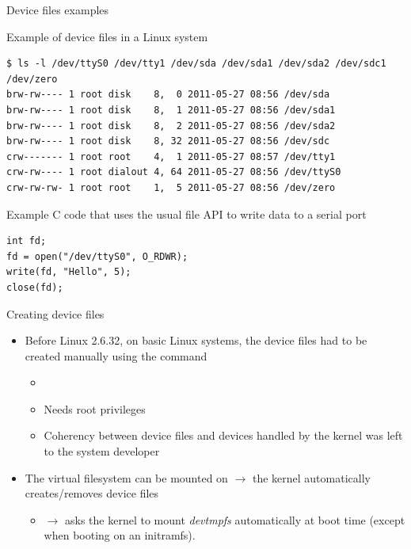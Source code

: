 \begin{frame}[fragile]{Device files examples}

Example of device files in a Linux system

\small
\begin{verbatim}
$ ls -l /dev/ttyS0 /dev/tty1 /dev/sda /dev/sda1 /dev/sda2 /dev/sdc1 /dev/zero
brw-rw---- 1 root disk    8,  0 2011-05-27 08:56 /dev/sda
brw-rw---- 1 root disk    8,  1 2011-05-27 08:56 /dev/sda1
brw-rw---- 1 root disk    8,  2 2011-05-27 08:56 /dev/sda2
brw-rw---- 1 root disk    8, 32 2011-05-27 08:56 /dev/sdc
crw------- 1 root root    4,  1 2011-05-27 08:57 /dev/tty1
crw-rw---- 1 root dialout 4, 64 2011-05-27 08:56 /dev/ttyS0
crw-rw-rw- 1 root root    1,  5 2011-05-27 08:56 /dev/zero
\end{verbatim}
\normalsize

Example C code that uses the usual file API to write data to a serial port

\small
\begin{verbatim}
int fd;
fd = open("/dev/ttyS0", O_RDWR);
write(fd, "Hello", 5);
close(fd);
\end{verbatim}
\end{frame}

\begin{frame}{Creating device files}
  \begin{itemize}
    \item Before Linux 2.6.32, on basic Linux systems,
    the device files had to be created manually using the
     command
    \begin{itemize}
    \item {}
    \item Needs root privileges
    \item Coherency between device files and devices handled by the
      kernel was left to the system developer
    \end{itemize}
  \item The  virtual filesystem can be mounted on
     $\rightarrow$ the kernel automatically creates/removes
    device files
    \begin{itemize}
    \item {} $\rightarrow$ asks the
      kernel to mount {\em devtmpfs} automatically at boot time
      (except when booting on an initramfs).
    \end{itemize}
  \end{itemize}
\end{frame}

